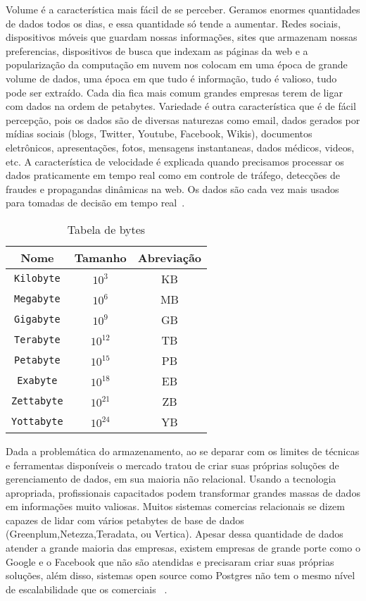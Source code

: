 Volume é a característica mais fácil de se perceber. Geramos enormes quantidades de dados todos os dias, e essa quantidade só tende a aumentar. Redes sociais, dispositivos móveis que guardam nossas informações, sites que armazenam nossas preferencias, dispositivos de busca que indexam as páginas da web e a popularização da computação em nuvem nos colocam em uma época de grande volume de dados, uma época em que tudo é informação, tudo é valioso, tudo pode ser extraído. Cada dia fica mais comum grandes empresas terem de ligar com dados na ordem de petabytes. Variedade é outra característica que é de fácil percepção, pois os dados são de diversas naturezas como email, dados gerados por mídias sociais (blogs, Twitter, Youtube, Facebook, Wikis), documentos eletrônicos, apresentações, fotos, mensagens instantaneas, dados médicos, videos, etc. A característica de velocidade é explicada quando precisamos processar os dados praticamente em tempo real como em controle de tráfego, detecções de fraudes e propagandas dinâmicas na web. Os dados são cada vez mais usados para tomadas de decisão em tempo real~\cite{promiseperil}.

\begin{table}
	\caption{Tabela de bytes}
	\begin{center}
	\begin{tabular}{ccc}
		\hline
			\textbf{Nome} & \textbf{Tamanho} & \textbf{Abreviação} \\
		\hline
			\texttt{Kilobyte}	& $10^3$ & KB \\
			\texttt{Megabyte}	& $10^6$ & MB \\
			\texttt{Gigabyte}	& $10^9$ & GB \\
			\texttt{Terabyte}	& $10^{12}$ & TB \\
			\texttt{Petabyte}	& $10^{15}$ & PB \\
			\texttt{Exabyte}	& $10^{18}$ & EB \\
			\texttt{Zettabyte}	& $10^{21}$ & ZB \\
			\texttt{Yottabyte}	& $10^{24}$ & YB \\
		\hline
	\end {tabular}
	\end{center}
	\label{tab:bytes}
\end{table}

Dada a problemática do armazenamento, ao se deparar com os limites de técnicas e ferramentas disponíveis o mercado tratou de criar suas próprias soluções de gerenciamento de dados, em sua maioria não relacional. Usando a tecnologia apropriada, profissionais capacitados podem transformar grandes massas de dados em informações muito valiosas. Muitos sistemas comercias relacionais se dizem capazes de lidar com vários petabytes de base de dados (Greenplum,Netezza,Teradata, ou Vertica). Apesar dessa quantidade de dados atender a grande maioria das empresas, existem empresas de grande porte como o Google e o Facebook que não são atendidas e precisaram criar suas próprias soluções, além disso, sistemas open source como Postgres  não tem o mesmo nível de escalabilidade que os comerciais ~\cite{fromdbtobigdata}.

